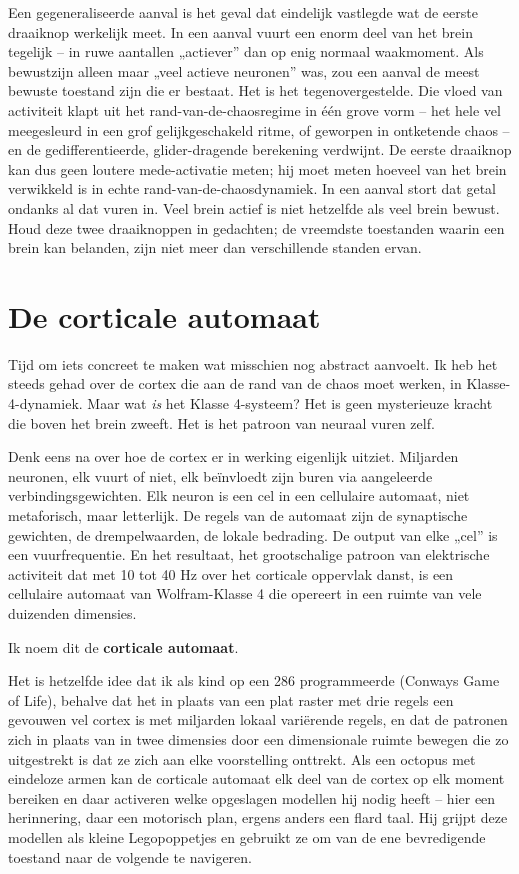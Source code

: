\documentclass[11pt, twoside, openright]{book}
\begin{document}
Een gegeneraliseerde aanval is het geval dat eindelijk vastlegde wat de eerste draaiknop werkelijk meet. In een aanval vuurt een enorm deel van het brein tegelijk -- in ruwe aantallen „actiever” dan op enig normaal waakmoment. Als bewustzijn alleen maar „veel actieve neuronen” was, zou een aanval de meest bewuste toestand zijn die er bestaat. Het is het tegenovergestelde. Die vloed van activiteit klapt uit het rand-van-de-chaosregime in één grove vorm -- het hele vel meegesleurd in een grof gelijkgeschakeld ritme, of geworpen in ontketende chaos -- en de gedifferentieerde, glider-dragende berekening verdwijnt. De eerste draaiknop kan dus geen loutere mede-activatie meten; hij moet meten hoeveel van het brein verwikkeld is in echte rand-van-de-chaosdynamiek. In een aanval stort dat getal ondanks al dat vuren in. Veel brein actief is niet hetzelfde als veel brein bewust. Houd deze twee draaiknoppen in gedachten; de vreemdste toestanden waarin een brein kan belanden, zijn niet meer dan verschillende standen ervan.

\section*{De corticale automaat}

Tijd om iets concreet te maken wat misschien nog abstract aanvoelt. Ik heb het steeds gehad over de cortex die aan de rand van de chaos moet werken, in Klasse-4-dynamiek. Maar wat \textit{is} het Klasse 4-systeem? Het is geen mysterieuze kracht die boven het brein zweeft. Het is het patroon van neuraal vuren zelf.

Denk eens na over hoe de cortex er in werking eigenlijk uitziet. Miljarden neuronen, elk vuurt of niet, elk beïnvloedt zijn buren via aangeleerde verbindingsgewichten. Elk neuron is een cel in een cellulaire automaat, niet metaforisch, maar letterlijk. De regels van de automaat zijn de synaptische gewichten, de drempelwaarden, de lokale bedrading. De output van elke „cel” is een vuurfrequentie. En het resultaat, het grootschalige patroon van elektrische activiteit dat met 10 tot 40 Hz over het corticale oppervlak danst, is een cellulaire automaat van Wolfram-Klasse 4 die opereert in een ruimte van vele duizenden dimensies.

Ik noem dit de \textbf{corticale automaat}.

Het is hetzelfde idee dat ik als kind op een 286 programmeerde (Conways Game of Life), behalve dat het in plaats van een plat raster met drie regels een gevouwen vel cortex is met miljarden lokaal variërende regels, en dat de patronen zich in plaats van in twee dimensies door een dimensionale ruimte bewegen die zo uitgestrekt is dat ze zich aan elke voorstelling onttrekt. Als een octopus met eindeloze armen kan de corticale automaat elk deel van de cortex op elk moment bereiken en daar activeren welke opgeslagen modellen hij nodig heeft -- hier een herinnering, daar een motorisch plan, ergens anders een flard taal. Hij grijpt deze modellen als kleine Legopoppetjes en gebruikt ze om van de ene bevredigende toestand naar de volgende te navigeren.
\end{document}
